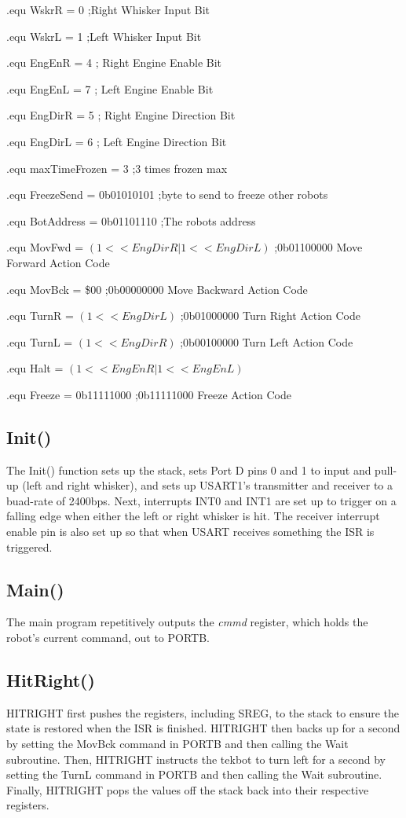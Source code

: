 \documentclass[12pt,letterpaper]{article}
\begin{document}
.equ  WskrR = 0						\hfill	;Right Whisker Input Bit

.equ  WskrL = 1						\hfill	;Left Whisker Input Bit

.equ  EngEnR = 4					\hfill	; Right Engine Enable Bit

.equ  EngEnL = 7					\hfill	; Left Engine Enable Bit

.equ  EngDirR = 5					\hfill	; Right Engine Direction Bit

.equ  EngDirL = 6					\hfill	; Left Engine Direction Bit

.equ  maxTimeFrozen = 3				\hfill	;3 times frozen max

.equ  FreezeSend = 0b01010101		\hfill	;byte to send to freeze other robots

.equ  BotAddress = 0b01101110		\hfill	;The robots address

.equ	MovFwd =  $(1<<EngDirR|1<<EngDirL)$	 \hfill;0b01100000 Move Forward Action Code

.equ	MovBck =  \$00					\hfill	;0b00000000 Move Backward Action Code

.equ	TurnR  =  $(1<<EngDirL)$			\hfill	;0b01000000 Turn Right Action Code

.equ	TurnL  =  $(1<<EngDirR)$				\hfill;0b00100000 Turn Left Action Code

.equ	Halt   =  $(1<<EngEnR|1<<EngEnL)$		

.equ	Freeze =  0b11111000			\hfill	;0b11111000 Freeze Action Code

\subsection{Init()}
	The Init() function sets up the stack, sets Port D pins 0 and 1 to input and pull-up (left and right whisker), and sets up USART1's transmitter and receiver to a buad-rate of 2400bps.
	Next, interrupts INT0 and INT1 are set up to trigger on a falling edge when either the left or right whisker is hit.
	The receiver interrupt enable pin is also set up so that when USART receives something the ISR is triggered.
	
	
\subsection{Main()}
	The main program repetitively outputs the \textit{cmmd} register, which holds the robot's current command, out to PORTB.
	
\subsection{HitRight()}
	HITRIGHT first pushes the registers, including SREG, to the stack to ensure the state is restored when the ISR is finished.
	HITRIGHT then backs up for a second by setting the MovBck command in PORTB and then calling the Wait subroutine.
	Then, HITRIGHT instructs the tekbot to turn left for a second by setting the TurnL command in PORTB and then calling the Wait subroutine.
	Finally, HITRIGHT pops the values off the stack back into their respective registers.
\end{document}
